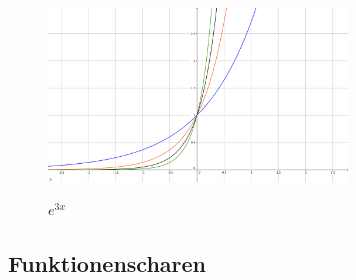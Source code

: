 \documentclass[a4paper]{article} %
\begin{document}
		\begin{minipage}{0.3\textwidth}
		\begin{figure}[H]
		\includegraphics[width=300px, height=200px]{E_4.png}
			\captionsetup{labelformat=empty}
				\centering
				\caption{$e^{x}$}
				\vspace{-0,3 cm}
				\caption{$e^{2x}$}
				\vspace{-0,3 cm}
				\caption{$e^{3x}$}
				\vspace{-0,3 cm}
				\caption{$e^{3x}$}
		\end{figure}
		\end{minipage} \hfill

		\subsection{Funktionenscharen}
	\newpage
\end{document}
